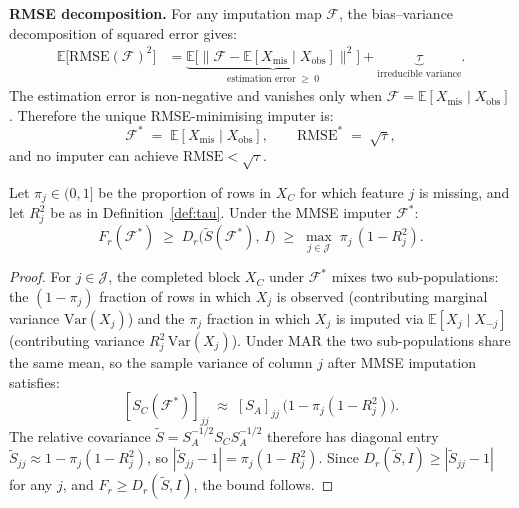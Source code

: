 \textbf{RMSE decomposition.} For any imputation map $\mathcal{F}$, the bias--variance decomposition of squared error gives:
\begin{align}
    \mathbb{E}\!\bigl[\mathrm{RMSE}(\mathcal{F})^2\bigr]
    &= \underbrace{\mathbb{E}\!\bigl[\|\mathcal{F} - \mathbb{E}[X_{\mathrm{mis}} \mid X_{\mathrm{obs}}]\|^2\bigr]}_{\text{estimation error} \;\geq\; 0}
    + \underbrace{\tau}_{\text{irreducible variance}}.
    \label{eq:rmse_decomp}
\end{align}
The estimation error is non-negative and vanishes only when $\mathcal{F} = \mathbb{E}[X_{\mathrm{mis}} \mid X_{\mathrm{obs}}]$.
Therefore the unique RMSE-minimising imputer is:
\begin{equation}
    \mathcal{F}^* \;=\; \mathbb{E}[X_{\mathrm{mis}} \mid X_{\mathrm{obs}}],
    \qquad
    \mathrm{RMSE}^* \;=\; \sqrt{\tau},
    \label{eq:mmse_imputer}
\end{equation}
and no imputer can achieve $\mathrm{RMSE} < \sqrt{\tau}$.

\begin{theorem}
\label{thm:fr_lower_bound}
Let $\pi_j \in (0,1]$ be the proportion of rows in $X_C$ for which feature $j$ is missing, and let $R_j^2$ be as in Definition~\ref{def:tau}. Under the MMSE imputer $\mathcal{F}^*$:
\begin{equation}
    F_r(\mathcal{F}^*) \;\geq\; D_r\!\bigl(\tilde{S}(\mathcal{F}^*),\, I\bigr)
    \;\geq\; \max_{j \in \mathcal{J}} \;\pi_j\,(1 - R_j^2).
    \label{eq:fr_lower_bound}
\end{equation}
\end{theorem}

\begin{proof}
For $j \in \mathcal{J}$, the completed block $X_C$ under $\mathcal{F}^*$ mixes two sub-populations: the $(1-\pi_j)$ fraction of rows in which $X_j$ is observed (contributing marginal variance $\mathrm{Var}(X_j)$) and the $\pi_j$ fraction in which $X_j$ is imputed via $\mathbb{E}[X_j \mid X_{-j}]$ (contributing variance $R_j^2\,\mathrm{Var}(X_j)$). Under MAR the two sub-populations share the same mean, so the sample variance of column $j$ after MMSE imputation satisfies:
\[
    [S_C(\mathcal{F}^*)]_{jj} \;\approx\; [S_A]_{jj}\,\bigl(1 - \pi_j(1 - R_j^2)\bigr).
\]
The relative covariance $\tilde{S} = S_A^{-1/2} S_C S_A^{-1/2}$ therefore has diagonal entry $\tilde{S}_{jj} \approx 1 - \pi_j(1-R_j^2)$, so $|\tilde{S}_{jj} - 1| = \pi_j(1-R_j^2)$. Since $D_r(\tilde{S},I) \geq |\tilde{S}_{jj} - 1|$ for any $j$, and $F_r \geq D_r(\tilde{S}, I)$, the bound follows.
\end{proof}

